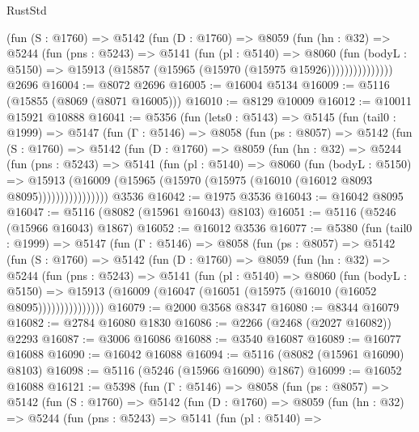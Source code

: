 \begin{lexlean}{RustStd}
\begin{coremodule}
{\begin{coremodule}
{{{{{{{{{{{{{{{{{{{{{{{{{{{{{{{              (fun (S : @1760) =>
              @5142
                (fun (D : @1760) =>
                @8059
                  (fun (hn : @32) =>
                  @5244
                    (fun (pns : @5243) =>
                    @5141
                      (fun (pl : @5140) =>
                      @8060
                        (fun (bodyL : @5150) =>
                        @15913 (@15857 (@15965 (@15970 (@15975 @15926)))))))))))))))
    @2696
@16004 := @8072 @2696
@16005 := @16004 @5134
@16009 := @5116 (@15855 (@8069 (@8071 @16005)))
@16010 := @8129 @10009
@16012 := @10011 @15921 @10888
@16041 := @5356
    (fun (lets0 : @5143) =>
    @5145
      (fun (tail0 : @1999) =>
      @5147
        (fun (Γ : @5146) =>
        @8058
          (fun (ps : @8057) =>
          @5142
            (fun (S : @1760) =>
            @5142
              (fun (D : @1760) =>
              @8059
                (fun (hn : @32) =>
                @5244
                  (fun (pns : @5243) =>
                  @5141
                    (fun (pl : @5140) =>
                    @8060
                      (fun (bodyL : @5150) =>
                      @15913
                        (@16009 (@15965 (@15970 (@15975 (@16010 (@16012 @8093 @8095))))))))))))))))
    @3536
@16042 := @1975 @3536
@16043 := @16042 @8095
@16047 := @5116 (@8082 (@15961 @16043) @8103)
@16051 := @5116 (@5246 (@15966 @16043) @1867)
@16052 := @16012 @3536
@16077 := @5380
    (fun (tail0 : @1999) =>
    @5147
      (fun (Γ : @5146) =>
      @8058
        (fun (ps : @8057) =>
        @5142
          (fun (S : @1760) =>
          @5142
            (fun (D : @1760) =>
            @8059
              (fun (hn : @32) =>
              @5244
                (fun (pns : @5243) =>
                @5141
                  (fun (pl : @5140) =>
                  @8060
                    (fun (bodyL : @5150) =>
                    @15913 (@16009 (@16047 (@16051 (@15975 (@16010 (@16052 @8095)))))))))))))))
@16079 := @2000 @3568 @8347
@16080 := @8344 @16079
@16082 := @2784 @16080 @1830
@16086 := @2266 (@2468 (@2027 @16082)) @2293
@16087 := @3006 @16086
@16088 := @3540 @16087
@16089 := @16077 @16088
@16090 := @16042 @16088
@16094 := @5116 (@8082 (@15961 @16090) @8103)
@16098 := @5116 (@5246 (@15966 @16090) @1867)
@16099 := @16052 @16088
@16121 := @5398
    (fun (Γ : @5146) =>
    @8058
      (fun (ps : @8057) =>
      @5142
        (fun (S : @1760) =>
        @5142
          (fun (D : @1760) =>
          @8059
            (fun (hn : @32) =>
            @5244
              (fun (pns : @5243) =>
              @5141
                (fun (pl : @5140) =>
}}}}}}}}}}}}}}}}}}}}}}}}}}}}}}}
\end{coremodule}}
\end{coremodule}
\end{lexlean}
